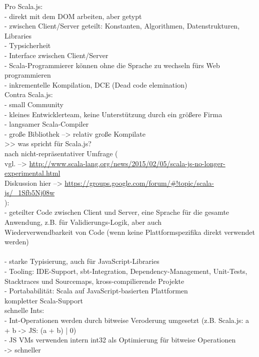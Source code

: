 \documentclass[a4paper, 12pt, hidelinks, listof=totoc, listoftables=totoc, bibliography=totoc]{scrreprt}
\begin{document}
Pro Scala.js: \\
    - direkt mit dem DOM arbeiten, aber getypt \\
    - zwischen Client/Server geteilt: Konstanten, Algorithmen, Datenstrukturen, Libraries \\
    - Typsicherheit \\
    - Interface zwischen Client/Server \\
    - Scala-Programmierer können ohne die Sprache zu wechseln fürs Web programmieren \\
    - inkrementelle Kompilation, DCE (Dead code elemination) \\
Contra Scala.js: \\
    - small Community \\
    - kleines Entwicklerteam, keine Unterstützung durch ein größere Firma \\
    - langsamer Scala-Compiler \\
    - große Bibliothek --> relativ große Kompilate \\





>> was spricht für Scala.js? \\
    nach nicht-repräsentativer Umfrage ( \\
      vgl.  -->  \url{http://www.scala-lang.org/news/2015/02/05/scala-js-no-longer-experimental.html} \\
      Diskussion hier  -->  \url{https://groups.google.com/forum/#!topic/scala-js/_1Sfb5Nj08w} \\
    ): \\
    - geteilter Code zwischen Client und Server, eine Sprache für die gesamte Anwendung, z.B. für Validierungs-Logik, aber auch \\ Wiederverwendbarkeit von Code (wenn keine Plattformspezifika direkt verwendet werden) \\
    \cite{doeraene2013.CSJ} \\
    - starke Typisierung, auch für JavaScript-Libraries \\
    - Tooling: IDE-Support, sbt-Integration, Dependency-Management, Unit-Tests, Stacktraces und Sourcemaps, kross-compilierende Projekte \\
    - Portababilität: Scala auf JavaScript-basierten Plattformen \\

  kompletter Scala-Support \\
  
  schnelle Ints: \\
  - Int-Operationen werden durch bitweise Veroderung umgesetzt (z.B. Scala.js: a + b -> JS: (a + b) | 0) \\
  - JS VMs verwenden intern int32 als Optimierung für bitweise Operationen \\
  -> schneller\cite{doeraene2015.SSP} \\
\end{document}
